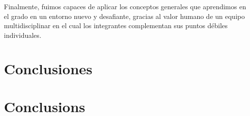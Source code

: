 Finalmente, fuimos capaces de aplicar los conceptos generales que aprendimos
 en el grado en un entorno nuevo y desafiante, gracias al valor humano de
 un equipo multidisciplinar en el cual los integrantes complementan sus
 puntos débiles individuales. 

\section{Conclusiones}
\label{makereference5.1}

\section{Conclusions}
\label{makereference5.2}
